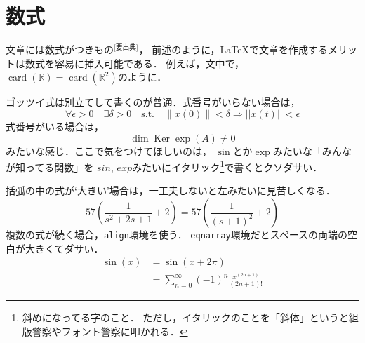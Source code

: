\documentclass[lualatex,a4paper,ja = standard, twoside, twocolumn]{bxjsarticle}
\begin{document}
\section{数式}
  文章には数式がつきもの$^\text{[要出典]}$，
  前述のように，\LaTeX で文章を作成するメリットは数式を容易に挿入可能である．
  例えば，文中で，
  $\operatorname{card}(\mathbb{R}) = \operatorname{card}(\mathbb{R}^2)$のように．
  \par ゴッツイ式は別立てして書くのが普通．式番号がいらない場合は，
    \[
      \forall \epsilon > 0 \quad \exists \delta > 0 \quad
      \text{s.t.} \quad
        \|x(0)\| < \delta \Rightarrow ||x(t)|| < \epsilon
    \]
  式番号がいる場合は，
    \begin{equation}
      \operatorname{dim}\operatorname{Ker}
        \exp(A) \neq 0
    \end{equation}
  みたいな感じ．ここで気をつけてほしいのは，
  $\sin$とか$\exp$みたいな「みんなが知ってる関数」を
  $sin$, $exp$みたいにイタリック\footnote{斜めになってる字のこと．
    ただし，イタリックのことを「斜体」というと組版警察やフォント警察に叩かれる．}で書くとクソダサい．
  \par 括弧の中の式が`大きい'場合は，一工夫しないと左みたいに見苦しくなる．
    \begin{equation}
      57(\frac{1}{s^2 + 2s + 1} + 2) =57\left(\frac{1}{(s + 1)^2} + 2 \right)
    \end{equation}
  複数の式が続く場合，\texttt{align}環境を使う．
  \texttt{eqnarray}環境だとスペースの両端の空白が大きくてダサい．
    \begin{align}
      \sin(x) &= \sin(x + 2\pi) \\
      &= \sum_{n = 0}^{\infty} (-1)^{n}\frac{x^{(2n + 1)}}{(2n + 1)!}
    \end{align}
\end{document}

